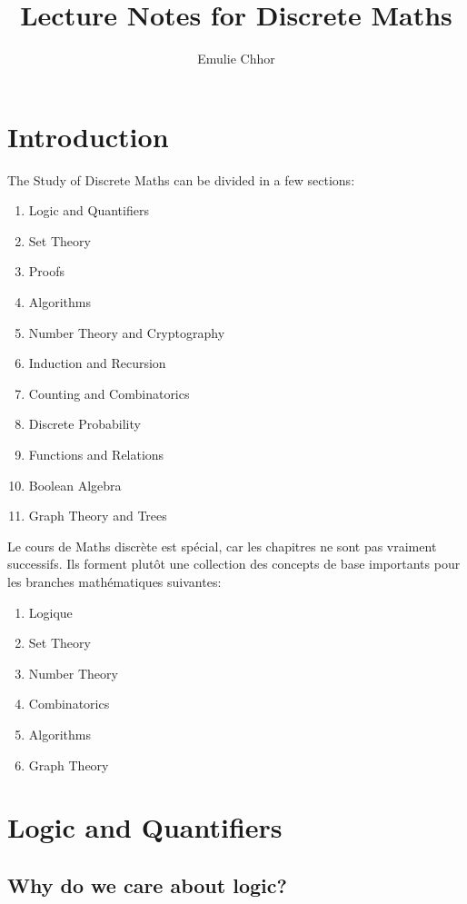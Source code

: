 \documentclass{article}
\begin{document}
\title{Lecture Notes for Discrete Maths}
\author{Emulie Chhor}
\maketitle
\section{Introduction}

The Study of Discrete Maths can be divided in a few sections:\\

    \begin{enumerate}
	\item Logic and Quantifiers
	\item Set Theory
	\item Proofs
	\item Algorithms
	\item Number Theory and Cryptography
	\item Induction and Recursion
	\item Counting and Combinatorics
	\item Discrete Probability
	\item Functions and Relations
	\item Boolean Algebra
	\item Graph Theory and Trees
    \end{enumerate}

Le cours de Maths discrète est spécial, car les chapitres ne sont pas
vraiment successifs. Ils forment plutôt une collection des concepts de
base importants pour les branches mathématiques suivantes:
\begin{enumerate}
    \item Logique
    \item Set Theory
    \item Number Theory
    \item Combinatorics
    \item Algorithms
    \item Graph Theory
\end{enumerate}

\section{Logic and Quantifiers}

\subsection{Why do we care about logic?}
\end{document}

